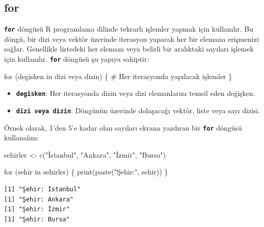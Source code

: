 \documentclass[
  letterpaper,
  DIV=11,
  numbers=noendperiod]{scrreprt}
\newenvironment{Shaded}{\begin{snugshade}}{\end{snugshade}}
\newcommand{\CommentTok}[1]{\textcolor[rgb]{0.37,0.37,0.37}{#1}}
\newcommand{\ControlFlowTok}[1]{\textcolor[rgb]{0.00,0.23,0.31}{#1}}
\newcommand{\FunctionTok}[1]{\textcolor[rgb]{0.28,0.35,0.67}{#1}}
\newcommand{\NormalTok}[1]{\textcolor[rgb]{0.00,0.23,0.31}{#1}}
\newcommand{\OtherTok}[1]{\textcolor[rgb]{0.00,0.23,0.31}{#1}}
\newcommand{\StringTok}[1]{\textcolor[rgb]{0.13,0.47,0.30}{#1}}
\begin{document}
\hypertarget{for}{%
\subsection{for}\label{for}}

\textbf{\texttt{for}} döngüsü R programlama dilinde tekrarlı işlemler
yapmak için kullanılır. Bu döngü, bir dizi veya vektör üzerinde
iterasyon yaparak her bir elemana erişmenizi sağlar. Genellikle
listedeki her elemanı veya belirli bir aralıktaki sayıları işlemek için
kullanılır. \textbf{\texttt{for}} döngüsü şu yapıya sahiptir:

\begin{Shaded}
\begin{Highlighting}[]
\ControlFlowTok{for}\NormalTok{ (degisken }\ControlFlowTok{in}\NormalTok{ dizi veya dizin) \{}
  \CommentTok{\# Her iterasyonda yapılacak işlemler}
\NormalTok{\}}
\end{Highlighting}
\end{Shaded}

\begin{itemize}
\item
  \textbf{\texttt{degisken}}: Her iterasyonda dizin veya dizi
  elemanlarını temsil eden değişken.
\item
  \textbf{\texttt{dizi\ veya\ dizin}}: Döngünün üzerinde dolaşacağı
  vektör, liste veya sayı dizisi.
\end{itemize}

Örnek olarak, 1'den 5'e kadar olan sayıları ekrana yazdıran bir
\textbf{\texttt{for}} döngüsü kullanalım:

\begin{Shaded}
\begin{Highlighting}[]
\NormalTok{sehirler }\OtherTok{\textless{}{-}} \FunctionTok{c}\NormalTok{(}\StringTok{"İstanbul"}\NormalTok{, }\StringTok{"Ankara"}\NormalTok{, }\StringTok{"İzmir"}\NormalTok{, }\StringTok{"Bursa"}\NormalTok{)}

\ControlFlowTok{for}\NormalTok{ (sehir }\ControlFlowTok{in}\NormalTok{ sehirler) \{}
  \FunctionTok{print}\NormalTok{(}\FunctionTok{paste}\NormalTok{(}\StringTok{"Şehir:"}\NormalTok{, sehir))}
\NormalTok{\}}
\end{Highlighting}
\end{Shaded}

\begin{verbatim}
[1] "Şehir: İstanbul"
[1] "Şehir: Ankara"
[1] "Şehir: İzmir"
[1] "Şehir: Bursa"
\end{verbatim}
\end{document}
